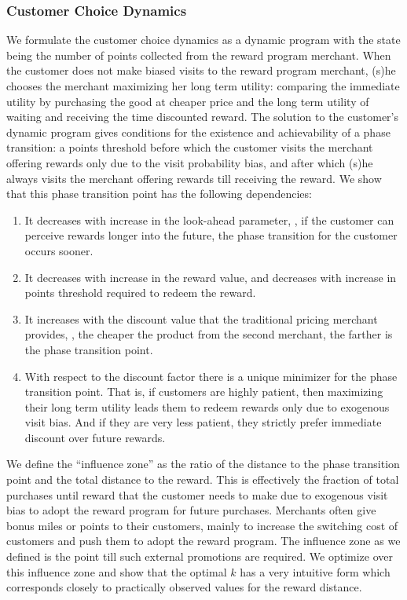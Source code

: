 \subsubsection{Customer Choice Dynamics}
We formulate the customer choice dynamics as a dynamic program with the state being the number of points collected from the reward program merchant.
When the customer does not make biased visits to the reward program merchant, (s)he chooses the merchant maximizing her long term utility: comparing the immediate utility by purchasing the good at cheaper price and the long term utility of waiting and receiving the time discounted reward.
The solution to the customer's dynamic program gives conditions for the existence and achievability of a phase transition: a points threshold before which the customer visits the merchant offering rewards only due to the visit probability bias, and after which (s)he always visits the merchant offering rewards till receiving the reward.
We show that this phase transition point has the following dependencies:
\begin{enumerate}
\item It decreases with increase in the look-ahead parameter, \ie, if the customer can perceive rewards longer into the future, the phase transition for the customer occurs sooner.
\item It decreases with increase in the reward value, and decreases with increase in points threshold required to redeem the reward. 
\item It increases with the discount value that the traditional pricing merchant provides, \ie, the cheaper the product from the second merchant, the farther is the phase transition point. 
\item With respect to the discount factor there is a unique minimizer for the phase transition point. That is, if customers are highly patient, then maximizing their long term utility leads them to redeem rewards only due to exogenous visit bias.
And if they are very less patient, they strictly prefer immediate discount over future rewards.
\end{enumerate}

We define the ``influence zone'' as the ratio of the distance to the phase transition  point and the total distance to the reward.
This is effectively the fraction of total purchases until reward that the customer needs to make due to exogenous visit bias to adopt the reward program for future purchases.
Merchants often give bonus miles or points to their customers, mainly to increase the switching cost of customers and push them to adopt the reward program.
The influence zone as we defined is the point till such external promotions are required.
We optimize over this influence zone and show that the optimal $k$ has a very intuitive form which corresponds closely to practically observed values for the reward distance.

